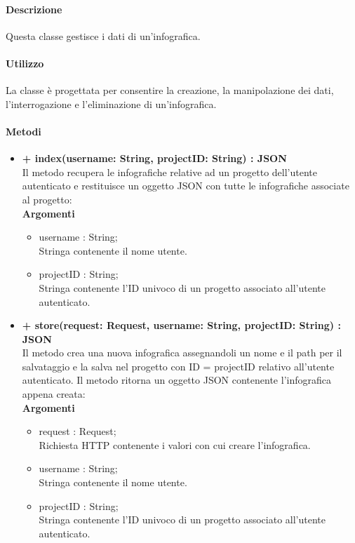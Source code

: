 	\paragraph{Descrizione}
		Questa classe gestisce i dati di un'infografica.
	\paragraph{Utilizzo}
		La classe è progettata per consentire la creazione, la manipolazione dei dati, l'interrogazione e l'eliminazione di un'infografica.
		
	\paragraph{Metodi}
		\begin{itemize}
			\item \textbf{+ index(username: String, projectID: String) : JSON}\\
			Il metodo recupera le infografiche relative ad un progetto dell'utente autenticato e restituisce un oggetto JSON con tutte le infografiche associate al progetto:\\
			\textbf{Argomenti}
			\begin{itemize}
				\item username : String; \\
				Stringa contenente il nome utente.
				\item projectID : String; \\
				Stringa contenente l'ID univoco di un progetto associato all'utente autenticato.
			\end{itemize}
			
			\item \textbf{+ store(request: Request, username: String, projectID: String) : JSON}\\
			Il metodo crea una nuova infografica assegnandoli un nome e il path per il salvataggio e la salva nel progetto con ID = projectID relativo all'utente autenticato. Il metodo ritorna un oggetto JSON contenente l'infografica appena creata:\\
			\textbf{Argomenti}
			\begin{itemize}
				\item request : Request;\\
				Richiesta HTTP contenente i valori con cui creare l'infografica.
				\item username : String; \\
				Stringa contenente il nome utente.
				\item projectID : String; \\
				Stringa contenente l'ID univoco di un progetto associato all'utente autenticato.
			\end{itemize}
			

\end{itemize}
